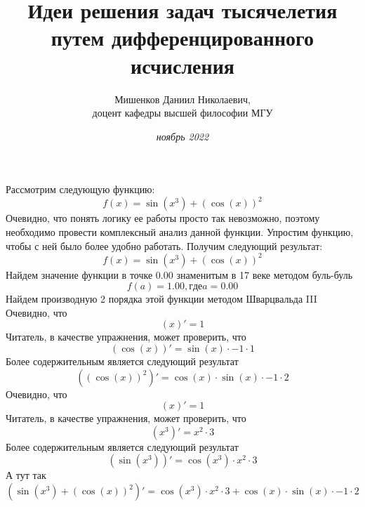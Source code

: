 \documentclass{article}
\title{\textbf {Идеи решения задач тысячелетия путем дифференцированного исчисления}}
\author{Мишенков Даниил Николаевич,\\
		доцент кафедры высшей философии МГУ}
\date{\textit {\normalsize {ноябрь 2022}}}
\begin{document}
\maketitle
\section {}
Рассмотрим следующую функцию:\newline
\[f(x) = \sin( x^{ 3 })+(\cos( x))^{ 2 }\]\newline
Очевидно, что понять логику ее работы просто так невозможно, поэтому необходимо провести комплексный анализ данной функции.\newline\newline
Упростим функцию, чтобы с ней было более удобно работать.\newline
Получим следующий результат:\newline\newline
\[f(x) = \sin( x^{ 3 })+(\cos( x))^{ 2 }\]\newline
Найдем значение функции в точке 0.00 знаменитым в 17 веке методом буль-буль\newline
\[f(a) = 1.00, где a = 0.00\]\newline
Найдем производную 2 порядка этой функции методом Шварцвальда III\newline
Очевидно, что\newline
\[( x)' =  1 \]\newline
Читатель, в качестве упражнения, может проверить, что\newline
\[(\cos( x))' = \sin( x)\cdot -1 \cdot 1 \]\newline
Более содержительным является следующий результат\newline
\[((\cos( x))^{ 2 })' = \cos( x)\cdot\sin( x)\cdot -1 \cdot 2 \]\newline
Очевидно, что\newline
\[( x)' =  1 \]\newline
Читатель, в качестве упражнения, может проверить, что\newline
\[( x^{ 3 })' =  x^{ 2 }\cdot 3 \]\newline
Более содержительным является следующий результат\newline
\[(\sin( x^{ 3 }))' = \cos( x^{ 3 })\cdot x^{ 2 }\cdot 3 \]\newline
А тут так\newline
\[(\sin( x^{ 3 })+(\cos( x))^{ 2 })' = \cos( x^{ 3 })\cdot x^{ 2 }\cdot 3 +\cos( x)\cdot\sin( x)\cdot -1 \cdot 2 \]\newline
\end{document}
